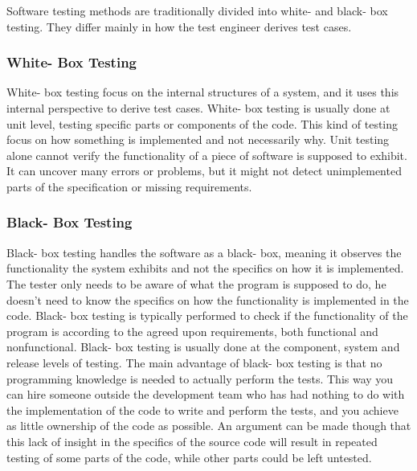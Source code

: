 Software testing methods are traditionally divided into white- and black- box testing. They differ mainly in how the test engineer derives test cases.

\subsubsection{White- Box Testing}
White- box testing focus on the internal structures of a system, and it uses this internal perspective to derive test cases. White- box testing is usually done at unit level, testing specific parts or components of the code. This kind of testing focus on how something is implemented and not necessarily why. Unit testing alone cannot verify the functionality of a piece of software is supposed to exhibit. It can uncover many errors or problems, but it might not detect unimplemented parts of the specification or missing requirements.

\subsubsection{Black- Box Testing}
Black- box testing handles the software as a black- box, meaning it observes the functionality the system exhibits and not the specifics on how it is implemented. The tester only needs to be aware of what the program is supposed to do, he doesn't need to know the specifics on how the functionality is implemented in the code. Black- box testing is typically performed to check if the functionality of the program is according to the agreed upon requirements, both functional and nonfunctional. Black- box testing is usually done at the component, system and release levels of testing. The main advantage of black- box testing is that no programming knowledge is needed to actually perform the tests. This way you can hire someone outside the development team who has had nothing to do with the implementation of the code to write and perform the tests, and you achieve as little ownership of the code as possible. An argument can be made though that this lack of insight in the specifics of the source code will result in repeated testing of some parts of the code, while other parts could be left untested.

